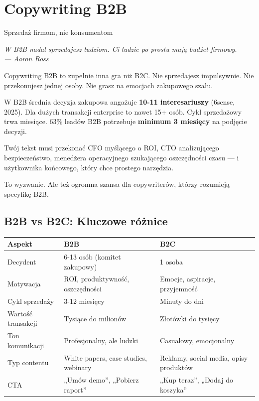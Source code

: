 \documentclass[
  12pt,
  a4paper,
  twoside,
  openright,
  12pt,
  DIV=12,
  BCOR=12mm]{scrbook}
\newcommand{\chapteropener}[1]{%
  \begin{center}
    \large\itshape\color{textmuted}#1
  \end{center}
  \vspace{1em}
}
\begin{document}

\chapter{Copywriting B2B}\label{copywriting-b2b}

Sprzedaż firmom, nie konsumentom

\hfill\break

\chapteropener{W B2B nadal sprzedajesz ludziom. Ci ludzie po prostu mają budżet firmowy.\\--- Aaron Ross}

Copywriting B2B to zupełnie inna gra niż B2C. Nie sprzedajesz
impulsywnie. Nie przekonujesz jednej osoby. Nie grasz na emocjach
zakupowego szału.

W B2B średnia decyzja zakupowa angażuje \textbf{10-11 interesariuszy}
(6sense, 2025). Dla dużych transakcji enterprise to nawet 15+ osób. Cykl
sprzedażowy trwa miesiące. 63\% leadów B2B potrzebuje \textbf{minimum 3
miesięcy} na podjęcie decyzji.

Twój tekst musi przekonać CFO myślącego o ROI, CTO analizującego
bezpieczeństwo, menedżera operacyjnego szukającego oszczędności czasu
--- i użytkownika końcowego, który chce prostego narzędzia.

To wyzwanie. Ale też ogromna szansa dla copywriterów, którzy rozumieją
specyfikę B2B.

\section{B2B vs B2C: Kluczowe
różnice}\label{b2b-vs-b2c-kluczowe-ruxf3ux17cnice}

\begin{tabular}{|p{4cm}|p{6cm}|p{6cm}|}
\hline
\textbf{Aspekt} & \textbf{B2B} & \textbf{B2C} \\
\hline
Decydent & 6-13 osób (komitet zakupowy) & 1 osoba \\
\hline
Motywacja & ROI, produktywność, oszczędności & Emocje, aspiracje, przyjemność \\
\hline
Cykl sprzedaży & 3-12 miesięcy & Minuty do dni \\
\hline
Wartość transakcji & Tysiące do milionów & Złotówki do tysięcy \\
\hline
Ton komunikacji & Profesjonalny, ale ludzki & Casualowy, emocjonalny \\
\hline
Typ contentu & White papers, case studies, webinary & Reklamy, social media, opisy produktów \\
\hline
CTA & „Umów demo”, „Pobierz raport” & „Kup teraz”, „Dodaj do koszyka” \\
\hline
\end{tabular}
\end{document}
